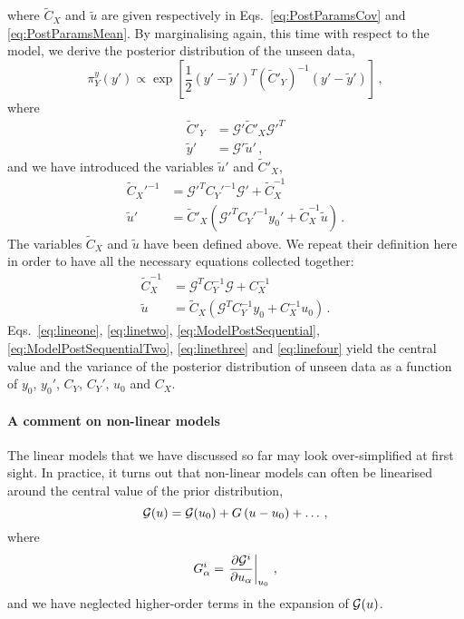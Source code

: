 where $\tilde{C}_{X}$ and $\tilde{u}$ are given respectively in
Eqs.~\ref{eq:PostParamsCov} and \ref{eq:PostParamsMean}. By marginalising again,
this time with respect to the model, we derive the posterior distribution of the
unseen data,
\begin{equation}
  \label{eq:MarginaliseModelU}
  \pi^y_{Y}(y') \propto 
  \exp \left[ 
   \frac12 \left(y' - \tilde{y}'\right)^T
   (\tilde{C}'_{Y})^{-1} 
   \left(y' - \tilde{y}'\right)
   \right]\, ,
\end{equation}
where
\begin{align}
  \label{eq:lineone}
  \tilde{C}'_{Y} 
  &= \mathcal{G}' \tilde{C}'_{X} \mathcal{G}'^{T} \\
  \label{eq:linetwo}
  \tilde{y}'
  &= \mathcal{G}' \tilde{u}'\, ,
\end{align}
and we have introduced the variables $\tilde{u}'$ and $\tilde{C}'_{X}$,  
\begin{align}
  \label{eq:ModelPostSequential}
  \tilde{C}_{X}'^{-1} 
  &= \mathcal{G}'^T C_{Y}'^{-1} \mathcal{G}' + \tilde{C}_{X}^{-1} \\
  \label{eq:ModelPostSequentialTwo}
  \tilde{u}' 
  &= \tilde{C}'_{X} \left(
    \mathcal{G}'^T C_{Y}'^{-1} y_0' + \tilde{C}_{X}^{-1} \tilde{u} 
    \right) \, .
\end{align}
The variables $\tilde{C}_{X}$ and $\tilde{u}$ have been defined above. We repeat
their definition here in order to have all the necessary equations collected
together: 
\begin{align}
  \label{eq:linethree}
  \tilde{C}_{X}^{-1}
  &= \mathcal{G}^T C_{Y}^{-1} \mathcal{G} + C_{X}^{-1} \\
  \label{eq:linefour}
  \tilde{u}
  &= \tilde{C}_{X} \left(
    \mathcal{G}^T C_{Y}^{-1} y_0 + C_{X}^{-1} u_0
  \right)\, .
\end{align}
Eqs.~\ref{eq:lineone}, \ref{eq:linetwo}, \ref{eq:ModelPostSequential},
\ref{eq:ModelPostSequentialTwo}, \ref{eq:linethree} and \ref{eq:linefour} yield
the central value and the variance of the posterior distribution of unseen data
as a function of $y_0$, $y_0'$, $C_Y$, $C_Y'$, $u_0$ and $C_X$. 

\paragraph{A comment on non-linear models}

The linear models that we have discussed so far may look over-simplified at
first sight. In practice, it turns out that non-linear models can often be
linearised around the central value of the prior distribution, 
\begin{equation}
  \label{eq:LinU0}
  \mathcal{G}(u) = \mathcal{G}(u_0) + G \left(u - u_0\right) + \ldots\, ,
\end{equation}
where 
\begin{equation}
  \label{eq:FirstDerU0}
  G^i_\alpha = \left. \frac{\partial \mathcal{G}^i}{\partial u_\alpha} \right|_{u_0}\, ,
\end{equation}
and we have neglected higher-order terms in the expansion of
$\mathcal{G}(u)$.

